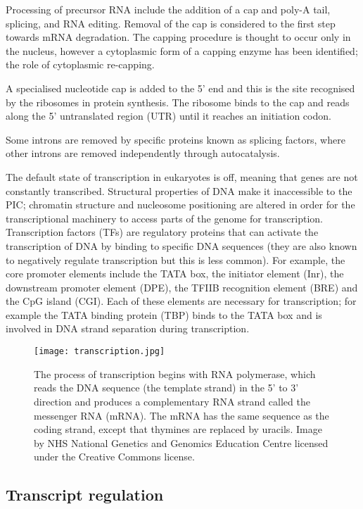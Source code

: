 Processing of precursor RNA include the addition of a cap and poly-A tail, splicing, and RNA editing. Removal of the cap is considered to the first step towards mRNA degradation. The capping procedure is thought to occur only in the nucleus, however a cytoplasmic form of a capping enzyme has been identified; the role of cytoplasmic re-capping.

A specialised nucleotide cap is added to the 5' end and this is the site recognised by the ribosomes in protein synthesis. The ribosome binds to the cap and reads along the 5' untranslated region (UTR) until it reaches an initiation codon.

Some introns are removed by specific proteins known as splicing factors, where other introns are removed independently through autocatalysis.

The default state of transcription in eukaryotes is off, meaning that genes are not constantly transcribed. Structural properties of DNA make it inaccessible to the PIC; chromatin structure and nucleosome positioning are altered in order for the transcriptional machinery to access parts of the genome for transcription. Transcription factors (TFs) are regulatory proteins that can activate the transcription of DNA by binding to specific DNA sequences (they are also known to negatively regulate transcription but this is less common). For example, the core promoter elements include the TATA box, the initiator element (Inr), the downstream promoter element (DPE), the TFIIB recognition element (BRE) and the CpG island (CGI). Each of these elements are necessary for transcription; for example the TATA binding protein (TBP) binds to the TATA box and is involved in DNA strand separation during transcription.


\begin{figure}[h]
   \centering
   \texttt{[image: transcription.jpg]}
   \caption[DNA transcription]{The process of transcription begins with RNA polymerase, which reads the DNA sequence (the template strand) in the 5' to 3' direction and produces a complementary RNA strand called the messenger RNA (mRNA). The mRNA has the same sequence as the coding strand, except that thymines are replaced by uracils. Image by NHS National Genetics and Genomics Education Centre licensed under the Creative Commons license.}
   \label{fig:transcription}
\end{figure}

\subsection{Transcript regulation}

